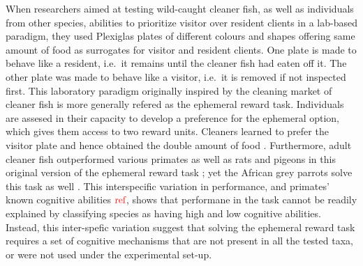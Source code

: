 \documentclass[]{rsos}%
\begin{document}
When researchers aimed at testing wild-caught cleaner fish, as
well as individuals from other species, abilities
to prioritize visitor over resident clients in a lab-based paradigm,
they used Plexiglas plates of different colours and shapes offering same
amount of food as surrogates for visitor and resident clients.
One plate is made to behave like a resident, i.e.~it remains until
the cleaner fish had eaten off it. The other plate was made to behave
like a visitor, i.e.~it is removed if not inspected first.
This laboratory paradigm originally inspired by the cleaning market
of cleaner fish is more generally refered as the ephemeral reward task.
Individuals are assesed in their capacity to develop a preference for the
ephemeral option, which gives them access to two reward units.
Cleaners learned to prefer the visitor plate and
hence obtained the double amount of food \citep{bshary_Asymmetric_2002}.
Furthermore, adult cleaner fish outperformed various primates as well as rats and
pigeons in this original version of the ephemeral reward task
\citep{salwiczek_Adult_2012, zentall_Early_2017}; yet the African grey
parrots solve this task as well \citep{pepperberg_Can_2014}. This interspecific
variation in performance, and primates' known cognitive abilities \(\color{red}{\text{ref}}\), shows that performane in the task
cannot be readily explained by classifying species as having high and
low cognitive abilities. Instead, this inter-spefic variation suggest
that solving the ephemeral reward task requires a set of cognitive
mechanisms that are not present in all the tested taxa, or were not used
under the experimental set-up.
\end{document}

